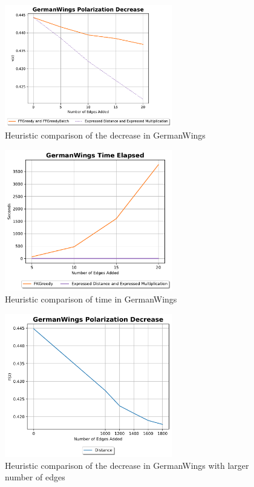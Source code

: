 \begin{table}[H]
\begin{figure}[H]
	\centering
	\includegraphics[width=0.65\textwidth]{Figures/GermanWings Polarization Decrease}
	\caption{Heuristic comparison of the decrease in GermanWings}
	\label{fig:germanwings_pol}
\end{figure}


\begin{figure}[H]
	\centering
	\includegraphics[width=0.65\textwidth]{Figures/GermanWings Time Elapsed}
	\caption{Heuristic comparison of time in GermanWings}
	\label{fig:germanwings_time}
\end{figure}
\clearpage

\begin{figure}[H]
	\centering
	\includegraphics[width=0.65\textwidth]{Figures/GermanWings Polarization Decrease 2}
	\caption{Heuristic comparison of the decrease in GermanWings with larger number of edges}
	\label{fig:germanwings_pol}
\end{figure}



\end{table}
